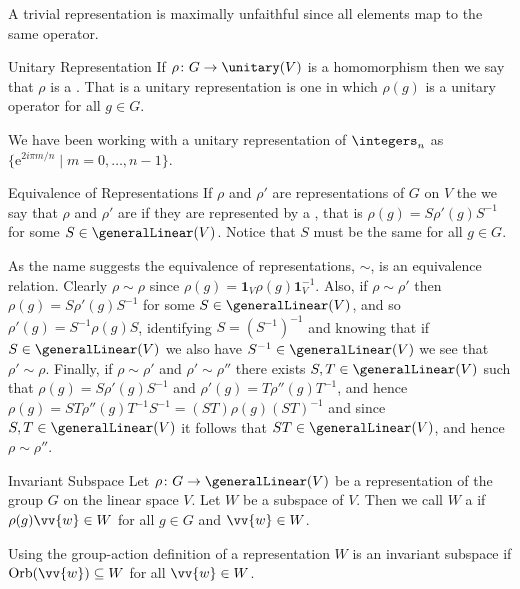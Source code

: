 \documentclass[fleqn]{NotesClass}
\newcommand*{\ident}{\mathbf{1}}
\newcommand*{\e}{\mathrm{e}}
\DeclareMathOperator{\Orb}{Orb}
\begin{document}
    A trivial representation is maximally unfaithful since all elements map to the same operator.
    
    \begin{dfn}{Unitary Representation}{}
        If \(\rho \colon G \to \unitary(V)\) is a homomorphism then we say that \(\rho\) is a .
        That is a unitary representation is one in which \(\rho(g)\) is a unitary operator for all \(g \in G\).
    \end{dfn}
    
    We have been working with a unitary representation of \(\integers_n\) as \(\{\e^{2i\pi m/n} \mid m = 0, \dotsc, n - 1\}\).
    
    \begin{dfn}{Equivalence of Representations}{}
        If \(\rho\) and \(\rho'\) are representations of \(G\) on \(V\) the we say that \(\rho\) and \(\rho'\) are  if they are represented by a , that is \(\rho(g) = S\rho'(g)S^{-1}\) for some \(S \in \generalLinear(V)\).
        Notice that \(S\) must be the same for all \(g \in G\).
    \end{dfn}
    
    As the name suggests the equivalence of representations, \(\sim\), is an equivalence relation.
    Clearly \(\rho \sim \rho\) since \(\rho(g) = \ident_V\rho(g)\ident_V^{-1}\).
    Also, if \(\rho \sim \rho'\) then \(\rho(g) = S\rho'(g)S^{-1}\) for some \(S \in \generalLinear(V)\), and so \(\rho'(g) = S^{-1}\rho(g)S\), identifying \(S = (S^{-1})^{-1}\) and knowing that if \(S \in \generalLinear(V)\) we also have \(S^{-1} \in \generalLinear(V)\) we see that \(\rho' \sim \rho\).
    Finally, if \(\rho \sim \rho'\) and \(\rho' \sim \rho''\) there exists \(S, T \in \generalLinear(V)\) such that \(\rho(g) = S\rho'(g)S^{-1}\) and \(\rho'(g) = T\rho''(g)T^{-1}\), and hence \(\rho(g) = ST\rho''(g)T^{-1}S^{-1} = (ST)\rho(g)(ST)^{-1}\) and since \(S, T \in \generalLinear(V)\) it follows that \(ST \in \generalLinear(V)\), and hence \(\rho \sim \rho''\).
    
    \begin{dfn}{Invariant Subspace}{}
        Let \(\rho \colon G \to \generalLinear(V)\) be a representation of the group \(G\) on the linear space \(V\).
        Let \(W\) be a subspace of \(V\).
        Then we call \(W\) a  if \(\rho(g)\vv{w} \in W\) for all \(g \in G\) and \(\vv{w} \in W\).
        
        Using the group-action definition of a representation \(W\) is an invariant subspace if \(\Orb(\vv{w}) \subseteq W\) for all \(\vv{w} \in W\).
    \end{dfn}
    
\end{document}
